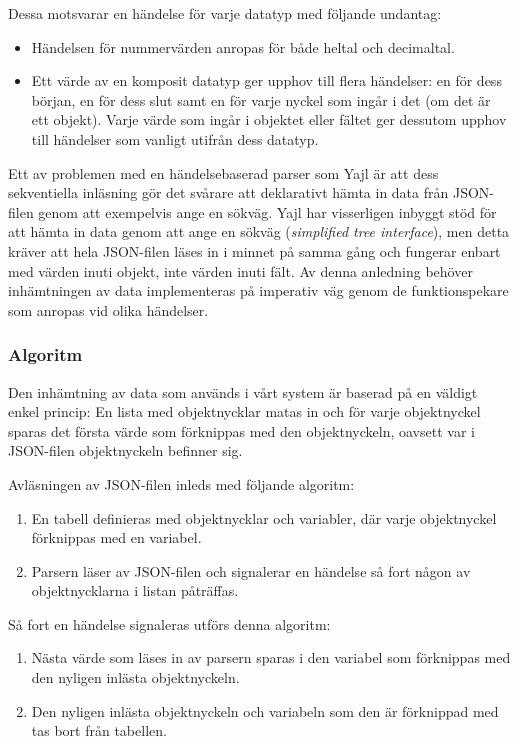 \documentclass[a4paper,11pt]{article}
\begin{document}
Dessa motsvarar en händelse för varje datatyp med följande undantag:

	\begin{itemize}
	\item Händelsen för nummervärden anropas för både heltal och decimaltal.
    	\item Ett värde av en komposit datatyp ger upphov till flera händelser: en för dess början, en för dess slut samt en för varje nyckel som ingår i det (om det är ett objekt). Varje värde som ingår i objektet eller fältet ger dessutom upphov till händelser som vanligt utifrån dess datatyp.
    	\end{itemize}
    	
Ett av problemen med en händelsebaserad parser som Yajl är att dess sekventiella inläsning gör det svårare att deklarativt hämta in data från JSON-filen genom att exempelvis ange en sökväg. Yajl har visserligen inbyggt stöd för att hämta in data genom att ange en sökväg ({\it simplified tree interface}), men detta kräver att hela JSON-filen läses in i minnet på samma gång och fungerar enbart med värden inuti objekt, inte värden inuti fält. Av denna anledning behöver inhämtningen av data implementeras på imperativ väg genom de funktionspekare som anropas vid olika händelser.

\subsubsection{Algoritm}

Den inhämtning av data som används i vårt system är baserad på en väldigt enkel princip: En lista med objektnycklar matas in och för varje objektnyckel sparas det första värde som förknippas med den objektnyckeln, oavsett var i JSON-filen objektnyckeln befinner sig.

Avläsningen av JSON-filen inleds med följande algoritm:

	\begin{enumerate}
    	\item En tabell definieras med objektnycklar och variabler, där varje objektnyckel förknippas med en variabel.
    	\item Parsern läser av JSON-filen och signalerar en händelse så fort någon av objektnycklarna i listan påträffas.
	\end{enumerate}

Så fort en händelse signaleras utförs denna algoritm:
	
	\begin{enumerate}
    	\item Nästa värde som läses in av parsern sparas i den variabel som förknippas med den nyligen inlästa objektnyckeln.
    	\item Den nyligen inlästa objektnyckeln och variabeln som den är förknippad med tas bort från tabellen.
	\end{enumerate}
\end{document}
